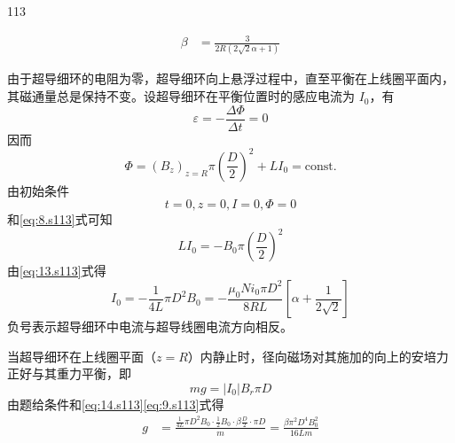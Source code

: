 \begin{solution}{113}
\begin{subsolution}
\begin{subsubsolution}
\begin{align}
                \beta &= \frac{3}{2 R (2 \sqrt{2} \alpha + 1)} \label{eq:10.s113}
            \end{align}
        \end{subsubsolution}
        \begin{subsubsolution}
            由于超导细环的电阻为零，超导细环向上悬浮过程中，直至平衡在上线圈平面内，其磁通量总是保持不变。设超导细环在平衡位置时的感应电流为 $I_{0}$，有
            \begin{equation}
                \varepsilon = - \frac{\Delta \Phi}{\Delta t} = 0
                \label{eq:11.s113}
            \end{equation}
            因而
            \begin{equation}
                \Phi = (B_{z})_{z=R} \pi \left(\frac{D}{2}\right)^{2} + L I_{0} = \text{const.}
                \label{eq:12.s113}
            \end{equation}
            由初始条件
            \begin{equation}
                t = 0, z = 0, I = 0, \Phi = 0
            \end{equation}
            和\eqref{eq:8.s113}式可知
            \begin{equation}
                L I_{0} = - B_{0} \pi \left(\frac{D}{2}\right)^{2}
                \label{eq:13.s113}
            \end{equation}
            由\eqref{eq:13.s113}式得
            \begin{equation}
                I_{0} = - \frac{1}{4 L} \pi D^{2} B_{0} = - \frac{\mu_{0} N i_{0} \pi D^{2}}{8 R L} \left[ \alpha + \frac{1}{2 \sqrt{2}} \right]
                \label{eq:14.s113}
            \end{equation}
            负号表示超导细环中电流与超导线圈电流方向相反。
        \end{subsubsolution}
        \begin{subsubsolution}
            当超导细环在上线圈平面（$z=R$）内静止时，径向磁场对其施加的向上的安培力正好与其重力平衡，即
            \begin{equation}
                m g = |I_{0}| B_{r} \pi D
                \label{eq:15.s113}
            \end{equation}
            由题给条件和\eqref{eq:14.s113}\eqref{eq:9.s113}式得
            \begin{equation}
                \begin{aligned}
                    g &= \frac{\frac{1}{4 L} \pi D^{2} B_{0} \cdot \frac{1}{2} B_{0} \cdot \beta \frac{D}{2} \cdot \pi D}{m} = \frac{\beta \pi^{2} D^{4} B_{0}^{2}}{16 L m} \\

\end{aligned}
\end{equation}
\end{subsubsolution}
\end{subsolution}
\end{solution}

